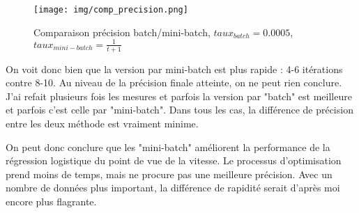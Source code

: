 \documentclass[12pt]{article}
\begin{document}
\begin{figure}[H]
\begin{center}
	\texttt{[image: img/comp\_precision.png]}
	\caption{Comparaison précision batch/mini-batch, $taux_{batch} = 0.0005$, $taux_{mini-batch} = \frac{1}{t+1}$}
\end{center}
\end{figure}
On voit donc bien que la version par mini-batch est plus rapide : 4-6 itérations contre 8-10.
Au niveau de la précision finale atteinte, on ne peut rien conclure. J'ai refait plusieurs fois les mesures et parfois la version par "batch" est meilleure et parfois c'est celle par "mini-batch". Dans tous les cas, la différence de précision entre les deux méthode est vraiment minime. 


On peut donc conclure que les "mini-batch" améliorent la performance de la régression logistique du point de vue de la vitesse. Le processus d'optimisation prend moins de temps, mais ne procure pas une meilleure précision. Avec un nombre de données plus important, la différence de rapidité serait d'après moi encore plus flagrante.
\end{document}
